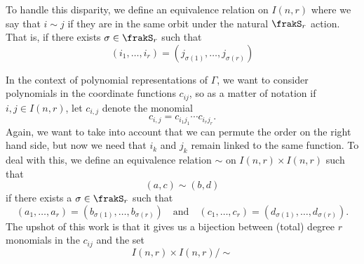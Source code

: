 \documentclass[12pt]{article}
\begin{document}
To handle this disparity, we define an equivalence relation on $I(n,r)$ where we say that $i\sim j$ if they are in the 
same orbit under the natural $\frakS_r$ action. That is, if there exists $\sigma\in\frakS_r$ such that
\[(i_1,\dots,i_r)=(j_{\sigma(1)},\dots,j_{\sigma(r)})\]

In the context of polynomial representations of $\Gamma$, we want to consider polynomials in the coordinate functions $c_{ij}$,
so as a matter of notation if $i,j\in I(n,r)$, let $c_{i,j}$ denote the monomial 
\[c_{i,j}=c_{i_1j_1}\cdots c_{i_rj_r}.\]
Again, we want to take into account that we can permute the order on the right hand side, but now we need that $i_k$ and $j_k$ 
remain linked to the same function. To deal with this, we define an equivalence relation $\sim$ on $I(n,r)\times I(n,r)$ such that 
\[(a,c)\sim (b,d)\]
if there exists a $\sigma\in\frakS_r$ such that 
\[(a_1,\dots,a_r)=(b_{\sigma(1)},\dots,b_{\sigma(r)})\quad\text{and}\quad(c_1,\dots,c_r)=(d_{\sigma(1)},\dots,d_{\sigma(r)}).\]
The upshot of this work is that it gives us a bijection between (total) degree $r$ monomials in the $c_{ij}$ and the set
\[I(n,r)\times I(n,r)/\sim\]
\end{document}
